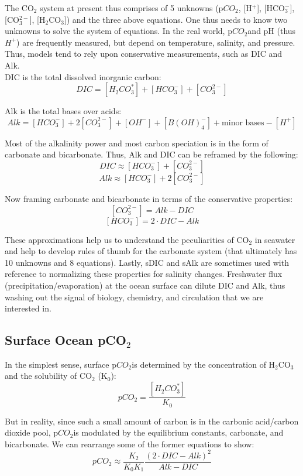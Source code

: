 \documentclass[12pt]{article}
\newcommand{\pco}{p$CO_{2}$}
\newcommand{\bicarb}{HCO$_{3}^{-}$}
\newcommand{\carb}{CO$_{3}^{2-}$}
\newcommand{\carbonic}{H$_{2}$CO$_{3}$}
\begin{document}
The CO$_{2}$ system at present thus comprises of 5 unknowns (\pco, [H$^{+}$], [\bicarb], [\carb], [\carbonic]) and the three above equations. One thus needs to know two unknowns to solve the system of equations. In the real world, \pco and pH (thus $H^{+}$) are frequently measured, but depend on temperature, salinity, and pressure. Thus, models tend to rely upon conservative measurements, such as DIC and Alk. \\

DIC is the total dissolved inorganic carbon:
$$
DIC = [H_{2}CO_{3}^{\ast}] + [HCO_{3}^{-}] + [CO_{3}^{2-}]
$$

Alk is the total bases over acids:
$$
Alk = [HCO_{3}^{-}] + 2[CO_{3}^{2-}] + [OH^{-}] + [B(OH)_{4}^{-}] + \textrm{minor bases} - [H^{+}]
$$

Most of the alkalinity power and most carbon speciation is in the form of carbonate and bicarbonate. Thus, Alk and DIC can be reframed by the following:
$$
DIC \approx [HCO_{3}^{-}] + [CO_{3}^{2-}]
$$
$$
Alk \approx [HCO_{3}^{-}] + 2[CO_{3}^{2-}]
$$

Now framing carbonate and bicarbonate in terms of the conservative properties:
$$
[CO_{3}^{2-}] = Alk - DIC
$$
$$
[HCO_{3}^{-}] = 2\cdot DIC - Alk
$$

These approximations help us to understand the peculiarities of CO$_{2}$ in seawater and help to develop rules of thumb for the carbonate system (that ultimately has 10 unknowns and 8 equations). Lastly, sDIC and sAlk are sometimes used with reference to normalizing these properties for salinity changes. Freshwater flux (precipitation/evaporation) at the ocean surface can dilute DIC and Alk, thus washing out the signal of biology, chemistry, and circulation that we are interested in.

\subsection{Surface Ocean pCO$_{2}$}
In the simplest sense, surface \pco is determined by the concentration of \carbonic and the solubility of CO$_{2}$ (K$_{0}$):
$$
pCO_{2} = \frac{[H_{2}CO_{3}^{\ast}]}{K_{0}}
$$

But in reality, since such a small amount of carbon is in the carbonic acid/carbon dioxide pool, \pco is modulated by the equilibrium constants, carbonate, and bicarbonate. We can rearrange some of the former equations to show:
\begin{equation}
pCO_{2} \approx \frac{K_{2}}{K_{0}K_{1}}\frac{(2\cdot DIC-Alk)^{2}}{Alk - DIC}
\end{equation}
\end{document}
